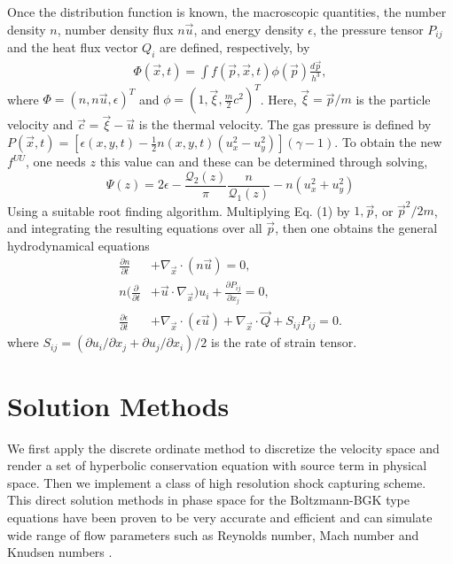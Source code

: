 \documentclass[twoside,twocolumn,prc,floats,amsmath,amssymb]{revtex4} %
\begin{document}
Once the distribution function is known, the macroscopic quantities, the number density $n$, number density flux $n \vec u$, and energy density $\epsilon$, the pressure tensor $P_{ij}$ and the heat flux vector $Q_{i}$ are defined, respectively, by
\begin{align}
\Phi (\vec x, t) = \int  f(\vec p, \vec x, t) \phi(\vec p)\frac{d \vec p }{ h^3},
\end{align}
where $\Phi =(n, n\vec u, \epsilon)^T$ and $\phi=(1, \vec \xi, \frac{m}{2} c^2)^T$.  Here, $\vec \xi =\vec p/m$ is the particle velocity and $\vec c= \vec \xi - \vec u$ is the thermal velocity.  The gas pressure is defined by $P(\vec x, t) = [\epsilon(x,y,t) -\frac{1}{2}n(x,y,t)(u_x^2-u_y^2)](\gamma-1)$. To obtain the new $f^{UU}$, one needs $z$ this value can and these can be determined through solving,
\begin{equation}
	\Psi(z) = 2\epsilon - \frac{\mathcal{Q}_{2}(z)}{\pi}\frac{n}{\mathcal{Q}_{1}(z)} - n(u_x^2 + u_y^2)
\end{equation}
Using a suitable root finding algorithm. Multiplying Eq. (1) by $1, \vec p$, or $\vec p^2/2m$, and integrating the resulting equations over all $\vec p$, then one obtains the general hydrodynamical equations
\begin{align}
\frac{ \partial n}{\partial t} &+ \nabla_{\vec x} \cdot (n \vec u) = 0, \\
n ( \frac{ \partial }{\partial t} &+ \vec u \cdot \nabla_{\vec x}) u_{i} + \frac{\partial P_{ij} }{\partial x_{j} } = 0, \\ 
\frac{\partial \epsilon}{\partial t} &+ \nabla_{\vec x} \cdot (\epsilon \vec u) + \nabla_{\vec x} \cdot \vec Q + S_{ij} P_{ij} = 0.
\end{align}
where $S_{ij}=(\partial u_{i}/\partial x_{j} +
\partial u_{j}/\partial x_{i})/2$ is the rate of strain tensor.

\section{Solution Methods}

We first apply the discrete ordinate method to discretize the velocity space and render a set of hyperbolic conservation equation with source term in physical space.  Then we implement a class of high resolution shock capturing scheme. This direct solution methods in phase space for the Boltzmann-BGK type equations have been proven to be very accurate and efficient and can simulate wide range of flow parameters such as Reynolds number, Mach number and Knudsen numbers \cite{Yang1995, Yang2013}. 
\end{document}
